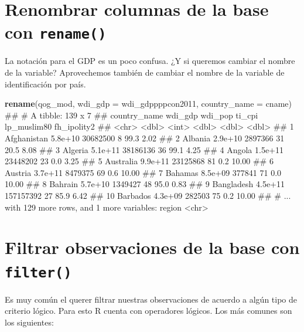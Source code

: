 \documentclass[]{book}
\newenvironment{Shaded}{\begin{snugshade}}{\end{snugshade}}
\newcommand{\KeywordTok}[1]{\textcolor[rgb]{0.13,0.29,0.53}{\textbf{#1}}}
\newcommand{\DataTypeTok}[1]{\textcolor[rgb]{0.13,0.29,0.53}{#1}}
\newcommand{\NormalTok}[1]{#1}
\begin{document}
\section{\texorpdfstring{Renombrar columnas de la base con
\texttt{rename()}}{Renombrar columnas de la base con rename()}}\label{renombrar-columnas-de-la-base-con-rename}

La notación para el GDP es un poco confusa. ¿Y si queremos cambiar el
nombre de la variable? Aprovechemos también de cambiar el nombre de la
variable de identificación por país.

\begin{Shaded}
\begin{Highlighting}[]
\KeywordTok{rename}\NormalTok{(qog_mod, }\DataTypeTok{wdi_gdp =}\NormalTok{ wdi_gdppppcon2011, }\DataTypeTok{country_name =}\NormalTok{ cname)}
\NormalTok{## # A tibble: 139 x 7}
\NormalTok{##    country_name wdi_gdp   wdi_pop ti_cpi lp_muslim80 fh_ipolity2}
\NormalTok{##           <chr>   <dbl>     <int>  <dbl>       <dbl>       <dbl>}
\NormalTok{##  1  Afghanistan 5.8e+10  30682500      8        99.3        2.02}
\NormalTok{##  2      Albania 2.9e+10   2897366     31        20.5        8.08}
\NormalTok{##  3      Algeria 5.1e+11  38186136     36        99.1        4.25}
\NormalTok{##  4       Angola 1.5e+11  23448202     23         0.0        3.25}
\NormalTok{##  5    Australia 9.9e+11  23125868     81         0.2       10.00}
\NormalTok{##  6      Austria 3.7e+11   8479375     69         0.6       10.00}
\NormalTok{##  7      Bahamas 8.5e+09    377841     71         0.0       10.00}
\NormalTok{##  8      Bahrain 5.7e+10   1349427     48        95.0        0.83}
\NormalTok{##  9   Bangladesh 4.5e+11 157157392     27        85.9        6.42}
\NormalTok{## 10     Barbados 4.3e+09    282503     75         0.2       10.00}
\NormalTok{## # ... with 129 more rows, and 1 more variables: region <chr>}
\end{Highlighting}
\end{Shaded}

\section{\texorpdfstring{Filtrar observaciones de la base con
\texttt{filter()}}{Filtrar observaciones de la base con filter()}}\label{filtrar-observaciones-de-la-base-con-filter}

Es muy común el querer filtrar nuestras observaciones de acuerdo a algún
tipo de criterio lógico. Para esto R cuenta con operadores lógicos. Los
más comunes son los siguientes:
\end{document}
